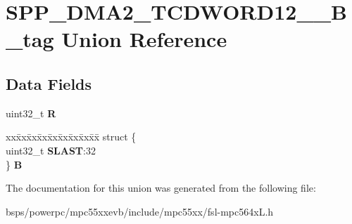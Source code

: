 \hypertarget{unionSPP__DMA2__TCDWORD12____32B__tag}{}\section{S\+P\+P\+\_\+\+D\+M\+A2\+\_\+\+T\+C\+D\+W\+O\+R\+D12\+\_\+\+\_\+B\+\_\+tag Union Reference}
\label{unionSPP__DMA2__TCDWORD12____32B__tag}
\subsection*{Data Fields}
\begin{DoxyCompactItemize}
\item 
\mbox{\label{unionSPP__DMA2__TCDWORD12____32B__tag_a5915785ad8946c1303d83b150190b337}} 
uint32\+\_\+t {\bfseries R}
\item 
\mbox{\label{unionSPP__DMA2__TCDWORD12____32B__tag_ab70b2d8d26a0cce9ebfdd63b490d01f3}} 
\begin{tabbing}
xx\=xx\=xx\=xx\=xx\=xx\=xx\=xx\=xx\=\kill
struct \{\\
\>uint32\_t {\bfseries SLAST}:32\\
\} {\bfseries B}\\

\end{tabbing}\end{DoxyCompactItemize}


The documentation for this union was generated from the following file\+:\begin{DoxyCompactItemize}
\item 
bsps/powerpc/mpc55xxevb/include/mpc55xx/fsl-\/mpc564x\+L.\+h\end{DoxyCompactItemize}
